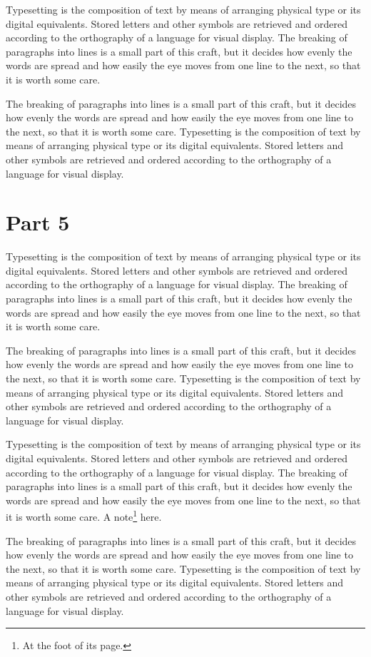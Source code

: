 \documentclass[parskip=half]{scrartcl}
\begin{document}
Typesetting is the composition of text by means of arranging physical type or its digital equivalents. Stored letters and other symbols are retrieved and ordered according to the orthography of a language for visual display. The breaking of paragraphs into lines is a small part of this craft, but it decides how evenly the words are spread and how easily the eye moves from one line to the next, so that it is worth some care.

The breaking of paragraphs into lines is a small part of this craft, but it decides how evenly the words are spread and how easily the eye moves from one line to the next, so that it is worth some care. Typesetting is the composition of text by means of arranging physical type or its digital equivalents. Stored letters and other symbols are retrieved and ordered according to the orthography of a language for visual display.

\section{Part 5}
Typesetting is the composition of text by means of arranging physical type or its digital equivalents. Stored letters and other symbols are retrieved and ordered according to the orthography of a language for visual display. The breaking of paragraphs into lines is a small part of this craft, but it decides how evenly the words are spread and how easily the eye moves from one line to the next, so that it is worth some care.

The breaking of paragraphs into lines is a small part of this craft, but it decides how evenly the words are spread and how easily the eye moves from one line to the next, so that it is worth some care. Typesetting is the composition of text by means of arranging physical type or its digital equivalents. Stored letters and other symbols are retrieved and ordered according to the orthography of a language for visual display.

Typesetting is the composition of text by means of arranging physical type or its digital equivalents. Stored letters and other symbols are retrieved and ordered according to the orthography of a language for visual display. The breaking of paragraphs into lines is a small part of this craft, but it decides how evenly the words are spread and how easily the eye moves from one line to the next, so that it is worth some care.
A note\footnote{At the foot of its page.} here.

The breaking of paragraphs into lines is a small part of this craft, but it decides how evenly the words are spread and how easily the eye moves from one line to the next, so that it is worth some care. Typesetting is the composition of text by means of arranging physical type or its digital equivalents. Stored letters and other symbols are retrieved and ordered according to the orthography of a language for visual display.
\end{document}
